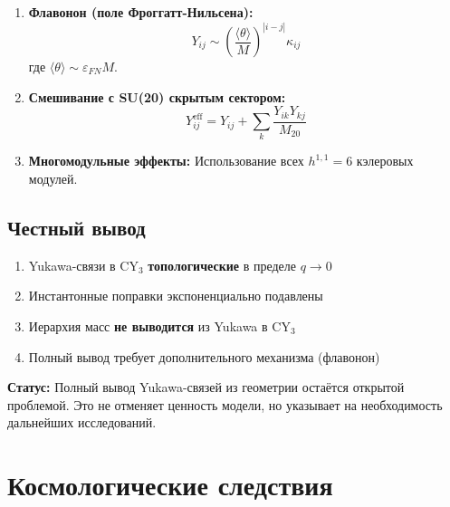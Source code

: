 \documentclass[12pt,a4paper,twoside]{article}
\newcommand{\EPS}{\varepsilon}
\theoremstyle{definition}
\begin{document}
\begin{enumerate}
    \item \textbf{Флавонон (поле Фроггатт-Нильсена):}
    \begin{equation}
    Y_{ij} \sim \left(\frac{\langle \theta \rangle}{M}\right)^{|i-j|} \kappa_{ij}
    \end{equation}
    где $\langle \theta \rangle \sim \EPS_{FN} M$.
    
    \item \textbf{Смешивание с SU(20) скрытым сектором:}
    \begin{equation}
    Y_{ij}^{\text{eff}} = Y_{ij} + \sum_k \frac{Y_{ik} Y_{kj}}{M_{20}}
    \end{equation}
    
    \item \textbf{Многомодульные эффекты:} Использование всех $h^{1,1} = 6$ кэлеровых модулей.
\end{enumerate}

\subsection{Честный вывод}

\begin{tcolorbox}[
  enhanced,
  colback=lightgray,
  colframe=bordeaux,
  boxrule=0.8pt,
  arc=4pt,
  title={\bfseries Результат анализа Yukawa-связей},
  coltitle=white,
  colbacktitle=bordeaux,
  breakable
]
\begin{enumerate}
    \item Yukawa-связи в CY$_3$ \textbf{топологические} в пределе $q \to 0$
    \item Инстантонные поправки экспоненциально подавлены
    \item Иерархия масс \textbf{не выводится} из Yukawa в CY$_3$
    \item Полный вывод требует дополнительного механизма (флавонон)
\end{enumerate}
\end{tcolorbox}

\textbf{Статус:} Полный вывод Yukawa-связей из геометрии остаётся открытой проблемой. Это не отменяет ценность модели, но указывает на необходимость дальнейших исследований.

\section{Космологические следствия}
\label{sec:cosmology}
\end{document}

